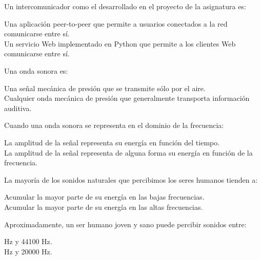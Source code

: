 \documentclass[legalpaper, 12pt, addpoints]{exam}
\begin{document}
\begin{questions}

\question Un intercomunicador como el desarrollado en el proyecto de la asignatura es:

\begin{oneparchoices}
  \choice Una aplicación peer-to-peer que permite a usuarios conectados a la red comunicarse entre sí.\\
  \choice Un servicio Web implementado en Python que permite a los clientes Web comunicarse entre sí.
\end{oneparchoices}
  
\vspace{0.10in}

\question Una onda sonora es:

\begin{oneparchoices}
  \choice Una señal mecánica de presión que se transmite sólo por el aire.\\
  \choice Cualquier onda mecánica de presión que generalmente transporta información auditiva.
\end{oneparchoices}
  
\question Cuando una onda sonora se representa en el dominio de la frecuencia:

\begin{oneparchoices}
  \choice La amplitud de la señal representa su energía en función del tiempo.\\
  \choice La amplitud de la señal representa de alguna forma su
  energía en función de la frecuencia.
\end{oneparchoices}
  
\vspace{0.10in}

\question La mayoría de los sonidos naturales que percibimos los seres humanos tienden a:

\begin{oneparchoices}
  \choice Acumular la mayor parte de su energía en las bajas frecuencias.\\
  \choice Acumular la mayor parte de su energía en las altas frecuencias.
\end{oneparchoices}
  
\vspace{0.10in}

\question Aproximadamente, un ser humano joven y sano puede percibir sonidos entre:

\begin{oneparchoices}
   Hz y 44100 Hz.\\
   Hz y 20000 Hz.
\end{oneparchoices}
  

\end{questions}
\end{document}
